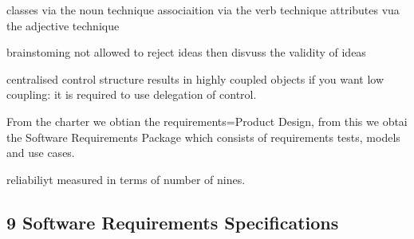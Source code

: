 classes via the noun technique
associaition via the verb technique
attributes vua the adjective technique


brainstoming
not allowed to reject ideas
then disvuss the validity of ideas


centralised control structure results in highly coupled objects
if you want low coupling: it is required to use delegation of control.


From the charter we obtian the requirements=Product Design, from this we obtai the Software Requirements Package which consists of requirements tests, models and use cases. 



reliabiliyt measured in terms of number of nines.


\subsection{9 Software Requirements Specifications}
